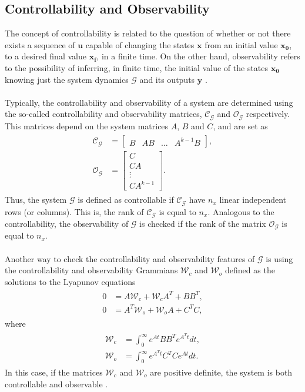 \subsection{Controllability and Observability}
The concept of controllability is related to the question of whether or not there exists a sequence of $\mathbf{u}$ capable of changing the states $\mathbf{x}$ from an initial value $\mathbf{x_0}$, to a desired final value $\mathbf{x_f}$, in a finite time. On the other hand, observability refers to the possibility of inferring, in finite time, the initial value of the states $\mathbf{x_0}$ knowing just the system dynamics $\mathcal{G}$ and its outputs $\mathbf{y}$ \cite{controlability1981}.
\\\\
Typically, the controllability and observability of a system are determined using the so-called controllability and observability matrices, $\mathcal{C_{G}}$ and $\mathcal{O_{G}}$ respectively.
This matrices depend on the system matrices $A$, $B$ and $C$, and are set as
\begin{align}
\begin{split}
\mathcal{C_{G}} & =
\begin{bmatrix}
B &  AB & \hdots & A^{k-1}B
\end{bmatrix},\\[5px]
\mathcal{O_G} & = \begin{bmatrix}
C\\
CA\\
\vdots\\
CA^{k-1}
\end{bmatrix}.
\end{split}
\end{align}
Thus, the system $\mathcal{G}$ is defined as controllable if $\mathcal{C_G}$ have $\mathit{n_x}$ linear independent rows (or columns). This is, the rank of $\mathcal{C_G}$ is equal to $\mathit{n_x}$. Analogous to the controllability, the observability of $\mathcal{G}$ is checked if the rank of the matrix $\mathcal{O_G}$ is equal to $\mathit{n_x}$.
\\\\
Another way to check the controllability and observability features of $\mathcal{G}$ is using the controllability and observability Grammians $\mathcal{W}_{c}$ and $\mathcal{W}_{o}$ defined as the solutions to the Lyapunov equations
\begin{align}
\begin{split}
0 & = A\mathcal{W}_{c} + \mathcal{W}_{c}A^{T} + BB^{T},\\[5px]
0 & = A^{T}\mathcal{W}_{o} + \mathcal{W}_{o}A + C^{T}C,
\end{split}
\end{align}
where
\begin{align}
\begin{split}
\mathcal{W}_{c} & = \int_{0}^{\infty}e^{At}BB^{T}e^{A^{T}t}dt,\\[5px]
\mathcal{W}_{o} & = \int_{0}^{\infty}e^{A^{T}t}C^{T}Ce^{At}dt.
\end{split}
\end{align}
In this case, if the matrices $\mathcal{W}_{c}$ and $\mathcal{W}_{o}$ are positive definite, the system is both controllable and observable \cite{Werner2012}.

